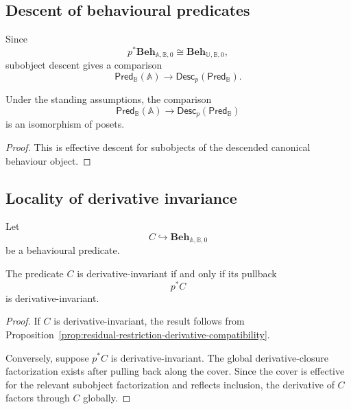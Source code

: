 \subsection{Descent of behavioural predicates}
\label{subsec:descent-behavioural-predicates}

Since
\[
    p^\ast
    \mathbf{Beh}_{\mathbb A,\mathbb B,0}
    \cong
    \mathbf{Beh}_{\mathbb U,\mathbb B,0},
\]
subobject descent gives a comparison
\[
    \mathsf{Pred}_{\mathbb B}(\mathbb A)
    \to
    \mathsf{Desc}_p(\mathsf{Pred}_{\mathbb B}).
\]

\begin{proposition}
\label{prop:descent-behavioural-predicates}
Under the standing assumptions, the comparison
\[
    \mathsf{Pred}_{\mathbb B}(\mathbb A)
    \longrightarrow
    \mathsf{Desc}_p(\mathsf{Pred}_{\mathbb B})
\]
is an isomorphism of posets.
\end{proposition}

\begin{proof}
This is effective descent for subobjects of the descended canonical behaviour
object.
\end{proof}

\subsection{Locality of derivative invariance}
\label{subsec:locality-derivative-invariance}

Let
\[
    C\hookrightarrow
    \mathbf{Beh}_{\mathbb A,\mathbb B,0}
\]
be a behavioural predicate.

\begin{proposition}
\label{prop:derivative-invariance-local}
The predicate \(C\) is derivative-invariant if and only if its pullback
\[
    p^\ast C
\]
is derivative-invariant.
\end{proposition}

\begin{proof}
If \(C\) is derivative-invariant, the result follows from
Proposition~\ref{prop:residual-restriction-derivative-compatibility}.

Conversely, suppose \(p^\ast C\) is derivative-invariant. The global
derivative-closure factorization exists after pulling back along the cover.
Since the cover is effective for the relevant subobject factorization and
reflects inclusion, the derivative of \(C\) factors through \(C\) globally.
\end{proof}

